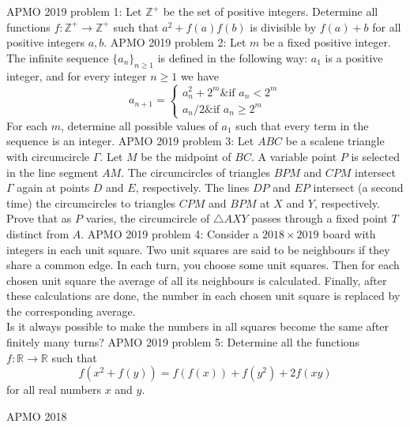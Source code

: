 APMO 2019 problem 1:  Let $\mathbb{Z}^+$ be the set of positive integers. Determine all functions $f : \mathbb{Z}^+\to\mathbb{Z}^+$ such that $a^2+f(a)f(b)$ is divisible by $f(a)+b$ for all positive integers $a,b$. 
APMO 2019 problem 2:  Let $m$ be a fixed positive integer. The infinite sequence $\{a_n\}_{n\geq 1}$ is defined in the following way: $a_1$ is a positive integer, and for every integer $n\geq 1$ we have
\[
a_{n+1} =
\begin{cases}a_n^2+2^m \& \text{if } a_n< 2^m \\ a_n/2 \&\text{if } a_n\geq 2^m\end{cases}
\]
For each $m$, determine all possible values of $a_1$ such that every term in the sequence is an integer. 
APMO 2019 problem 3:  Let $ABC$ be a scalene triangle with circumcircle $\Gamma$. Let $M$ be the midpoint of $BC$. A variable point $P$ is selected in the line segment $AM$. The circumcircles of triangles $BPM$ and $CPM$ intersect $\Gamma$ again at points $D$ and $E$, respectively. The lines $DP$ and $EP$ intersect (a second time) the circumcircles to triangles $CPM$ and $BPM$ at $X$ and $Y$, respectively. Prove that as $P$ varies, the circumcircle of $\triangle AXY$ passes through a fixed point $T$ distinct from $A$. 
APMO 2019 problem 4:  Consider a $2018 \times 2019$ board with integers in each unit square. Two unit squares are said to be neighbours if they share a common edge. In each turn, you choose some unit squares. Then for each chosen unit square the average of all its neighbours is calculated. Finally, after these calculations are done, the number in each chosen unit square is replaced by the corresponding average. \\
Is it always possible to make the numbers in all squares become the same after finitely many turns? 
APMO 2019 problem 5:  Determine all the functions $f : \mathbb{R} \to \mathbb{R}$ such that
\[ f(x^2 + f(y)) = f(f(x)) + f(y^2) + 2f(xy) \]
for all real numbers $x$ and $y$. 

APMO 2018 


